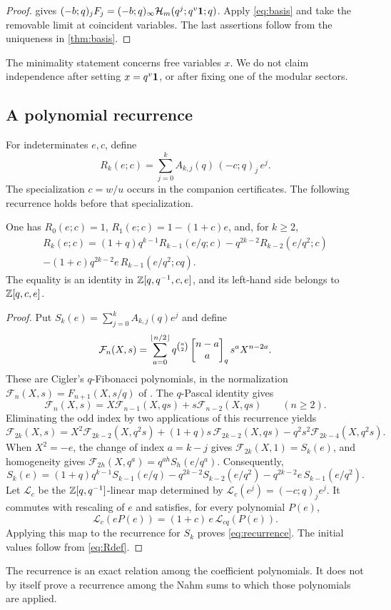 \begin{proof}
 gives $(-b;q)_jF_j=(-b;q)_\infty\mathcal{H}_m(q^j;q^v\mathbf{1};q)$. Apply \eqref{eq:basis} and take the removable limit at coincident variables. The last assertions follow from the uniqueness in \cref{thm:basis}.
\end{proof}

The minimality statement concerns free variables $x$. We do not claim independence after setting $x=q^v\mathbf{1}$, or after fixing one of the modular sectors.

\subsection{A polynomial recurrence}
For indeterminates $e,c$, define
\begin{equation}\label{eq:Rdef}
R_k(e;c)=\sum_{j=0}^kA_{k,j}(q)\,(-c;q)_j\,e^j.
\end{equation}
The specialization $c=w/u$ occurs in the companion certificates. The following recurrence holds before that specialization.

\begin{proposition}\label{prop:recurrence}
One has $R_0(e;c)=1$, $R_1(e;c)=1-(1+c)e$, and, for $k\ge2$,
\begin{multline}\label{eq:recurrence}
R_k(e;c)=(1+q)q^{k-1}R_{k-1}(e/q;c)-q^{2k-2}R_{k-2}(e/q^2;c)\\
-(1+c)q^{2k-2}e\,R_{k-1}(e/q^2;cq).
\end{multline}
The equality is an identity in $\mathbb{Z}[q,q^{-1},c,e]$, and its left-hand side belongs to $\mathbb{Z}[q,c,e]$.
\end{proposition}

\begin{proof}
Put $S_k(e)=\sum_{j=0}^kA_{k,j}(q)e^j$ and define
\[
\mathcal F_n(X,s)=\sum_{a=0}^{\lfloor n/2\rfloor}q^{\binom a2}\begin{bmatrix}n-a\\a\end{bmatrix}_qs^aX^{n-2a}.
\]
These are Cigler's $q$-Fibonacci polynomials, in the normalization $\mathcal F_n(X,s)=F_{n+1}(X,s/q)$ of \cite[Theorem~2.1]{Cigler03}. The $q$-Pascal identity gives
\[
\mathcal F_n(X,s)=X\mathcal F_{n-1}(X,qs)+s\mathcal F_{n-2}(X,qs)\qquad(n\ge2).
\]
Eliminating the odd index by two applications of this recurrence yields
\[
\mathcal F_{2k}(X,s)=X^2\mathcal F_{2k-2}(X,q^2s)+(1+q)s\,\mathcal F_{2k-2}(X,qs)-q^2s^2\mathcal F_{2k-4}(X,q^2s).
\]
When $X^2=-e$, the change of index $a=k-j$ gives $\mathcal F_{2k}(X,1)=S_k(e)$, and homogeneity gives $\mathcal F_{2h}(X,q^a)=q^{ah}S_h(e/q^a)$. Consequently,
\[
S_k(e)=(1+q)q^{k-1}S_{k-1}(e/q)-q^{2k-2}S_{k-2}(e/q^2)-q^{2k-2}e\,S_{k-1}(e/q^2).
\]
Let $\mathcal L_c$ be the $\mathbb{Z}[q,q^{-1}]$-linear map determined by $\mathcal L_c(e^j)=(-c;q)_je^j$. It commutes with rescaling of $e$ and satisfies, for every polynomial $P(e)$,
\[
\mathcal L_c(eP(e))=(1+c)\,e\,\mathcal L_{cq}(P(e)).
\]
Applying this map to the recurrence for $S_k$ proves \eqref{eq:recurrence}. The initial values follow from \eqref{eq:Rdef}.
\end{proof}

The recurrence is an exact relation among the coefficient polynomials. It does not by itself prove a recurrence among the Nahm sums to which those polynomials are applied.

